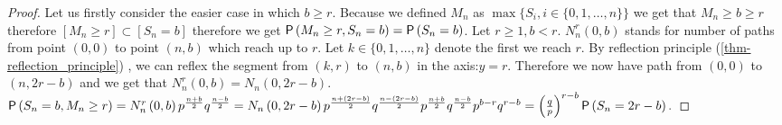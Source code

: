 \begin{proof}
 Let us firstly consider the easier case in which $b \geq r$. Because we defined $M_n$ as $\max \{S_i, i\in \{0, 1, \ldots, n \} \}$ we get that $M_n \geq b \geq r$ therefore $[M_n \geq r] \subset [S_n=b]$ therefore we get $\operatorname{\textsf{P}} \left( M_n\geq r, S_n=b \right) =
 \operatorname{\textsf{P}} \left( S_n=b \right) $.
 Let $r\geq 1, b<r$. $N_n^r \left( 0,b \right) $ stands for number of paths from point $ \left( 0,0 \right) $ to point $ \left( n,b \right) $ which reach up to $r$. Let $k \in \{ 0, 1, \ldots, n \}$ denote the first \Time we reach $r$. By reflection principle (\ref{thm-reflection_principle}) , we can reflex the segment from $\left(k,r\right)$ to $ \left( n,b \right) $ in the axis:$y=r$. Therefore we now have path from $ \left( 0,0 \right) $ to $ \left( n,2r-b \right) $ and we get that $N_n^r \left( 0,b \right) =N_n \left( 0,2r-b \right) $. $\operatorname{\textsf{P}} \left( S_n=b,M_n\geq r \right) =N_n^r \left( 0,b \right) p^{\frac{n+b}{2}}q^{\frac{n-b}{2}}=N_n \left( 0,2r-b \right) p^{\frac{n+ \left( 2r-b \right) }{2}}q^{\frac{n- \left( 2r-b \right) }{2}}p^{\frac{n+b}{2}}q^{\frac{n-b}{2}}p^{b-r}q^{r-b}= \left( \frac{q}{p} \right) ^{r-b}\operatorname{\textsf{P}} \left( S_n=2r-b \right) .$
\end{proof}

